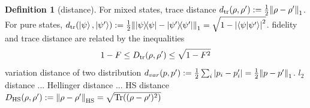 \documentclass[
aps,
pra,
twocolumn,
floatfix,
]{revtex4-2}
\theoremstyle{plain}
\theoremstyle{definition}
\newtheorem{definition}{Definition}
\newcommand{\dm}{\rho}
\begin{document}
\begin{definition}[distance]\label{def:distance}
	For mixed states, trace distance $d_{\tr}(\dm,\dm') : = \frac{1}{2} \norm{\dm-\dm'}_1$.
	For pure states, $d_{\tr}(\ket{\psi},\ket{\psi'}) : = \frac{1}{2}\norm{\op{\psi} -\op{\psi'}}_1 = \sqrt{1-\abs{\ip{\psi}{\psi'}}^2}$.
	fidelity and trace distance are related by the inequalities
	\begin{equation}
		1-F\le D_{\tr}(\dm,\dm') \le \sqrt{1-F^2}
	\end{equation}
	variation distance of two distribution $d_{var}(p,p') : = \frac{1}{2} \sum_i \abs{p_i-p_i'} = \frac{1}{2} \norm{p-p'}_1$.
	$l_2$ distance ... Hellinger distance ... HS distance $D_{\text{HS}}(\dm,\dm'): = \norm{\dm-\dm'}_{\text{HS}}=\sqrt{\Tr((\dm-\dm')^2)}$
\end{definition}
\end{document}
